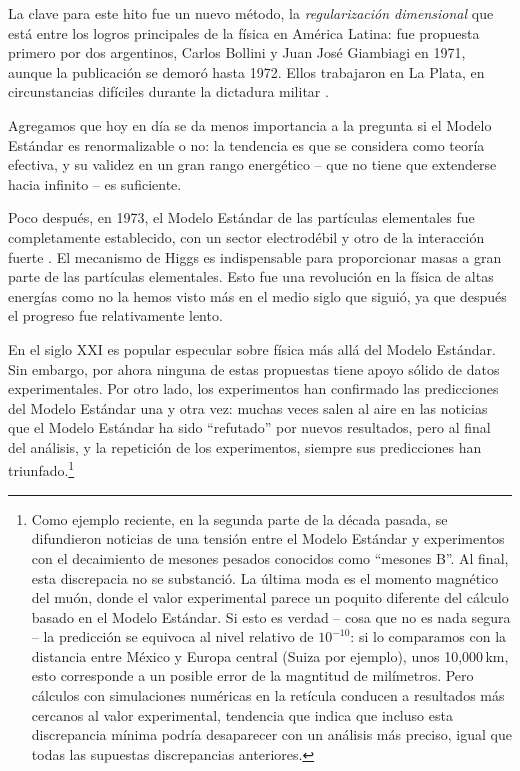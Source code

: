 La clave para este hito fue un nuevo m\'etodo, la {\em regularizaci\'on
dimensional} que est\'a entre los logros principales de la f\'isica en
Am\'erica Latina: fue propuesta primero por dos argentinos, Carlos Bollini
y Juan Jos\'e Giambiagi en 1971, aunque la publicaci\'on \cite{BolGiam}
se demor\'o hasta 1972. Ellos trabajaron en La Plata, en
circunstancias dif\'iciles durante la dictadura militar \cite{DimReg}.

Agregamos que hoy en d\'ia se da menos importancia a la pregunta
si el Modelo Est\'andar es renormalizable o no: la tendencia es que se
considera como teor\'ia efectiva, y su validez en un gran rango
energ\'etico -- que no tiene que extenderse hacia infinito --
es suficiente.

Poco despu\'es, en 1973, el Modelo Est\'andar de las part\'iculas
elementales fue completamente establecido, con un sector
electrod\'ebil \cite{Weinberg,Salam} y otro de la interacci\'on
fuerte \cite{QCD}. El mecanismo de Higgs es indispensable para
proporcionar masas a gran parte de las part\'iculas elementales.
Esto fue una revoluci\'on en la f\'isica de altas energ\'ias como no la
hemos visto m\'as en el medio siglo que sigui\'o, ya que despu\'es el
progreso fue relativamente lento.




En el siglo XXI es popular especular sobre f\'isica m\'as all\'a
del Modelo Est\'andar. Sin embargo, por ahora ninguna de estas propuestas
tiene apoyo s\'olido de datos experimentales. Por otro lado, los
experimentos han confirmado las predicciones del Modelo Est\'andar una
y otra vez: muchas veces salen al aire en las noticias que el
Modelo Est\'andar ha sido ``refutado''
por nuevos resultados, pero al final del an\'alisis, y la repetici\'on
de los experimentos, siempre sus predicciones han
triunfado.\footnote{Como ejemplo reciente, en la segunda parte de la
  d\'ecada pasada, se difundieron noticias de una tensi\'on entre el Modelo
  Est\'andar y experimentos con el decaimiento de mesones pesados
  conocidos como ``mesones B''. Al final, esta discrepacia no se
  substanci\'o. La \'ultima moda es el momento magn\'etico del
  mu\'on, donde el valor experimental parece un poquito diferente
  del c\'alculo basado en el Modelo Est\'andar. Si esto es verdad --
  cosa que no es nada segura -- la predicci\'on se equivoca al
  nivel relativo de $10^{-10}$: si lo comparamos con la distancia
  entre M\'exico y Europa central (Suiza por ejemplo), unos
  10,000\,km, esto corresponde a un posible error de la magntitud
  de mil\'imetros. Pero c\'alculos con simulaciones num\'ericas
  en la ret\'icula conducen a resultados m\'as cercanos al valor
  experimental, tendencia que indica que incluso esta discrepancia
  m\'inima podr\'ia desaparecer con un an\'alisis m\'as preciso,
  igual que todas las supuestas discrepancias anteriores.}
  
